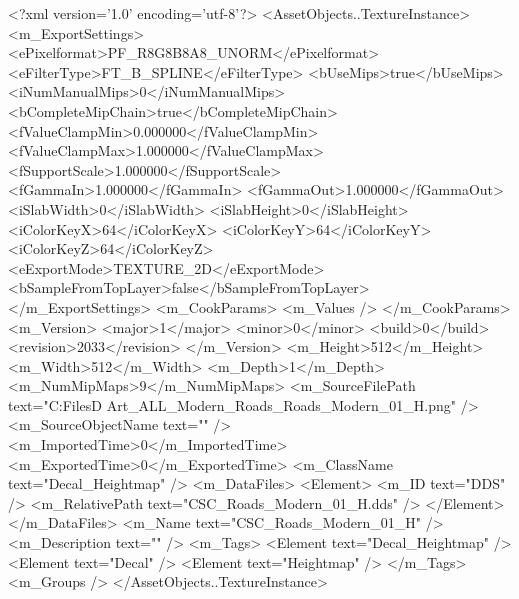 <?xml version='1.0' encoding='utf-8'?>
<AssetObjects..TextureInstance>
  <m_ExportSettings>
    <ePixelformat>PF_R8G8B8A8_UNORM</ePixelformat>
    <eFilterType>FT_B_SPLINE</eFilterType>
    <bUseMips>true</bUseMips>
    <iNumManualMips>0</iNumManualMips>
    <bCompleteMipChain>true</bCompleteMipChain>
    <fValueClampMin>0.000000</fValueClampMin>
    <fValueClampMax>1.000000</fValueClampMax>
    <fSupportScale>1.000000</fSupportScale>
    <fGammaIn>1.000000</fGammaIn>
    <fGammaOut>1.000000</fGammaOut>
    <iSlabWidth>0</iSlabWidth>
    <iSlabHeight>0</iSlabHeight>
    <iColorKeyX>64</iColorKeyX>
    <iColorKeyY>64</iColorKeyY>
    <iColorKeyZ>64</iColorKeyZ>
    <eExportMode>TEXTURE_2D</eExportMode>
    <bSampleFromTopLayer>false</bSampleFromTopLayer>
  </m_ExportSettings>
  <m_CookParams>
    <m_Values />
  </m_CookParams>
  <m_Version>
    <major>1</major>
    <minor>0</minor>
    <build>0</build>
    <revision>2033</revision>
  </m_Version>
  <m_Height>512</m_Height>
  <m_Width>512</m_Width>
  <m_Depth>1</m_Depth>
  <m_NumMipMaps>9</m_NumMipMaps>
  <m_SourceFilePath text="C:\Users\Shadow\Desktop\Working Files\3D Art\Decals\CSC_ALL_Modern_Roads\textures\CSC_Roads_Modern_01_H.png" />
  <m_SourceObjectName text="" />
  <m_ImportedTime>0</m_ImportedTime>
  <m_ExportedTime>0</m_ExportedTime>
  <m_ClassName text="Decal_Heightmap" />
  <m_DataFiles>
    <Element>
      <m_ID text="DDS" />
      <m_RelativePath text="CSC_Roads_Modern_01_H.dds" />
    </Element>
  </m_DataFiles>
  <m_Name text="CSC_Roads_Modern_01_H" />
  <m_Description text="" />
  <m_Tags>
    <Element text="Decal_Heightmap" />
    <Element text="Decal" />
    <Element text="Heightmap" />
  </m_Tags>
  <m_Groups />
</AssetObjects..TextureInstance>